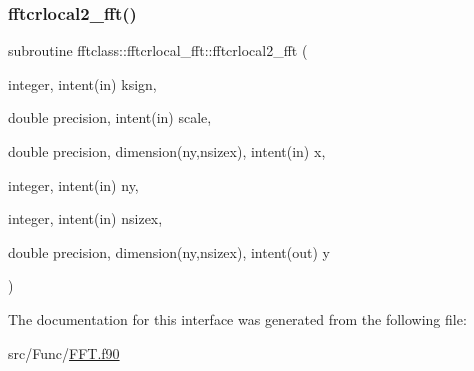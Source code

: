 \mbox{\label{interfacefftclass_1_1fftcrlocal__fft_a61c3b16caab87c9a268ae178f67aea26}} 
\subsubsection{\texorpdfstring{fftcrlocal2\_fft()}{fftcrlocal2\_fft()}}
{\footnotesize\ttfamily subroutine fftclass\+::fftcrlocal\+\_\+fft\+::fftcrlocal2\+\_\+fft (\begin{DoxyParamCaption}\item[{integer, intent(in)}]{ksign,  }\item[{double precision, intent(in)}]{scale,  }\item[{double precision, dimension(ny,nsizex), intent(in)}]{x,  }\item[{integer, intent(in)}]{ny,  }\item[{integer, intent(in)}]{nsizex,  }\item[{double precision, dimension(ny,nsizex), intent(out)}]{y }\end{DoxyParamCaption})}



The documentation for this interface was generated from the following file\+:\begin{DoxyCompactItemize}
\item 
src/\+Func/\mbox{\hyperlink{_f_f_t_8f90}{F\+F\+T.\+f90}}\end{DoxyCompactItemize}
